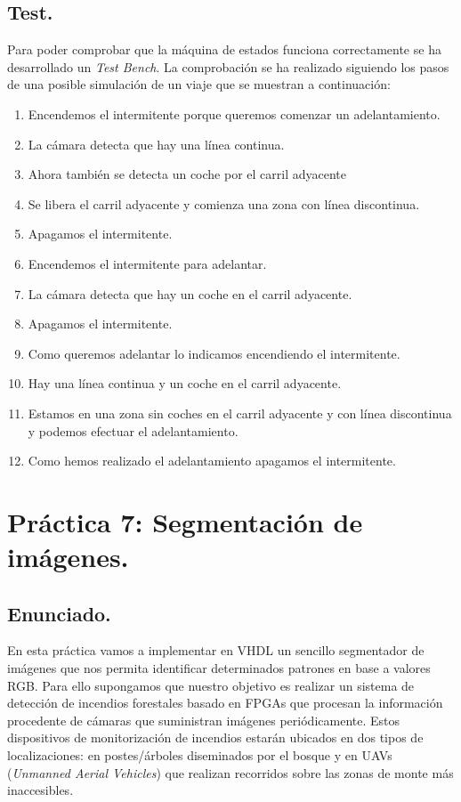 \documentclass{article}
\begin{document}
\subsection{Test.}

	Para poder comprobar que la máquina de estados funciona correctamente se ha desarrollado un \emph{Test Bench}. La comprobación se ha realizado siguiendo los pasos de una posible simulación de un viaje que se muestran a continuación:
	
\begin{enumerate}
	\item Encendemos el intermitente porque queremos comenzar un adelantamiento.
	\item La cámara detecta que hay una línea continua.
	\item Ahora también se detecta un coche por el carril adyacente
	\item Se libera el carril adyacente y comienza una zona con  línea discontinua.
	\item Apagamos el intermitente.
	\item Encendemos el intermitente para adelantar.
	\item La cámara detecta que hay un coche en el carril adyacente.
	\item Apagamos el intermitente.
	\item Como queremos adelantar lo indicamos encendiendo el intermitente.
	\item Hay una línea continua y un coche en el carril adyacente.
	\item Estamos en una zona sin coches en el carril adyacente y con línea discontinua y podemos efectuar el adelantamiento.
	\item Como hemos realizado el adelantamiento apagamos el intermitente.
\end{enumerate}

\section{Práctica 7: Segmentación de imágenes.}

\subsection{Enunciado.}

	En esta práctica vamos a implementar en VHDL un sencillo segmentador de imágenes que nos permita identificar determinados patrones en base a valores RGB. Para ello supongamos que nuestro objetivo es realizar un sistema de detección de incendios forestales basado en FPGAs que procesan la información procedente de cámaras que suministran imágenes periódicamente. Estos dispositivos de monitorización de incendios estarán ubicados en dos tipos de localizaciones: en postes/árboles diseminados por el bosque y en UAVs (\textit{Unmanned Aerial Vehicles}) que realizan recorridos sobre las zonas de monte más inaccesibles.
	
\end{document}

